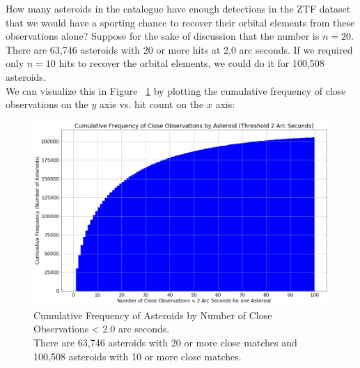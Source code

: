 How many asteroids in the catalogue have enough detections in the ZTF dataset that we would have 
a sporting chance to recover their orbital elements from these observations alone?
Suppose for the sake of discussion that the number is $n=20$.
There are 63,746 asteroids with 20 or more hits at 2.0 arc seconds.
If we required only $n=10$ hits to recover the orbital elements, we could do it for 100,508 asteroids.\\
We can visualize this in Figure ~\ref{fig:ztf_cum_hit_freq} by plotting the cumulative frequency of close observations on the $y$ axis vs. hit count on the $x$ axis:
\begin{figure}[hbt!]
\begin{center}
\includegraphics[width=1.0\textwidth]{../figs/ztf/nearest_ast_cum.png}
\end{center}
\caption[Cumulative Frequency of Asteroids by Number of Close Observations < 2.0 arc seconds]
{Cumulative Frequency of Asteroids by Number of Close Observations < 2.0 arc seconds. \\
There are 63,746 asteroids with 20 or more close matches and 100,508 asteroids with 10 or more close matches. }
\label{fig:ztf_cum_hit_freq}
\end{figure}

